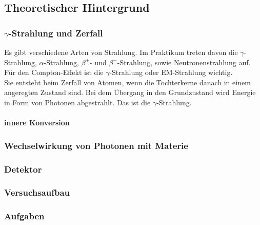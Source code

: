 \subsection{Theoretischer Hintergrund}
\subsubsection{$\gamma$-Strahlung und Zerfall}
Es gibt verschiedene Arten von Strahlung. Im Praktikum treten davon die $\gamma$-Strahlung, $\alpha$-Strahlung, $\beta^{+}$- und $\beta^{-}$-Strahlung, sowie Neutronenstrahlung auf. Für den Compton-Effekt ist die $\gamma$-Strahlung oder EM-Strahlung wichtig. \\
Sie entsteht beim Zerfall von Atomen, wenn die Tochterkerne danach in einem angeregten Zustand sind. Bei dem Übergang in den Grundzustand wird Energie in Form von Photonen abgestrahlt. Das ist die $\gamma$-Strahlung.\\

\paragraph{innere Konversion}

\subsubsection{Wechselwirkung von Photonen mit Materie}

\subsubsection{Detektor}

\subsubsection{Versuchsaufbau}

\subsubsection{Aufgaben}
